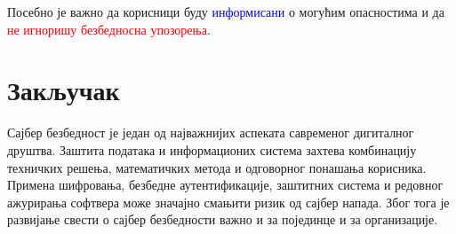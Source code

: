 \documentclass[12pt,a4paper]{article}
\begin{document}
Посебно је важно да корисници буду \textcolor{blue}{информисани} о могућим опасностима и да \textcolor{red}{не игноришу безбедносна упозорења}.

\section{Закључак}

Сајбер безбедност је један од најважнијих аспеката савременог дигиталног друштва. Заштита података и информационих система захтева комбинацију техничких решења, математичких метода и одговорног понашања корисника.
Примена шифровања, безбедне аутентификације, заштитних система и редовног ажурирања софтвера може значајно смањити ризик од сајбер напада. Због тога је развијање свести о сајбер безбедности важно и за појединце и за организације.
\end{document}
